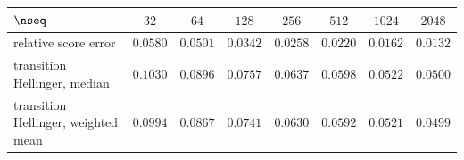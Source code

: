 
\begin{center}\small
\begin{tabular}{@{}lccccccc@{}}
\toprule
$\nseq$ & $32$ & $64$ & $128$ & $256$ & $512$ & $1024$ & $2048$ \\
\midrule
relative score error & $0.0580$ & $0.0501$ & $0.0342$ & $0.0258$ & $0.0220$ & $0.0162$ & $0.0132$ \\
transition Hellinger, median & $0.1030$ & $0.0896$ & $0.0757$ & $0.0637$ & $0.0598$ & $0.0522$ & $0.0500$ \\
transition Hellinger, weighted mean & $0.0994$ & $0.0867$ & $0.0741$ & $0.0630$ & $0.0592$ & $0.0521$ & $0.0499$ \\
\bottomrule
\end{tabular}
\end{center}
